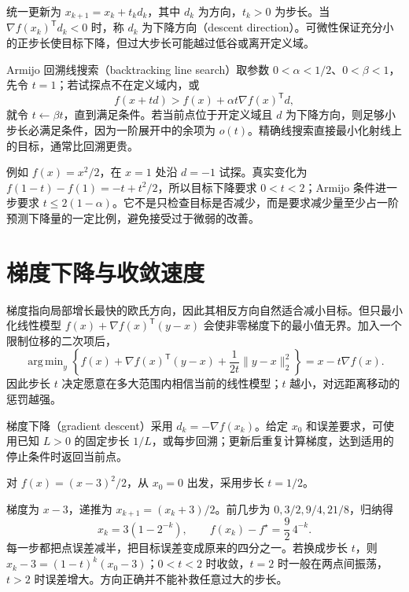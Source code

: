 \documentclass[UTF8,12pt,a4paper,fontset=fandol]{ctexbook}
\begin{document}
统一更新为 $x_{k+1}=x_k+t_kd_k$，其中 $d_k$ 为方向，$t_k>0$ 为步长。当 $\nabla f(x_k)^{\mathsf T}d_k<0$ 时，称 $d_k$ 为下降方向（descent direction）。可微性保证充分小的正步长使目标下降，但过大步长可能越过低谷或离开定义域。

Armijo 回溯线搜索（backtracking line search）取参数 $0<\alpha<1/2$、$0<\beta<1$，先令 $t=1$；若试探点不在定义域内，或
\[
 f(x+td)>f(x)+\alpha t\nabla f(x)^{\mathsf T}d,
\]
就令 $t\leftarrow\beta t$，直到满足条件。若当前点位于开定义域且 $d$ 为下降方向，则足够小步长必满足条件，因为一阶展开中的余项为 $o(t)$。精确线搜索直接最小化射线上的目标，通常比回溯更贵。

例如 $f(x)=x^2/2$，在 $x=1$ 处沿 $d=-1$ 试探。真实变化为 $f(1-t)-f(1)=-t+t^2/2$，所以目标下降要求 $0<t<2$；Armijo 条件进一步要求 $t\leq2(1-\alpha)$。它不是只检查目标是否减少，而是要求减少量至少占一阶预测下降量的一定比例，避免接受过于微弱的改善。

\section{梯度下降与收敛速度}

\label{sec:co-gradient}

梯度指向局部增长最快的欧氏方向，因此其相反方向自然适合减小目标。但只最小化线性模型 $f(x)+\nabla f(x)^{\mathsf T}(y-x)$ 会使非零梯度下的最小值无界。加入一个限制位移的二次项后，
\[
 \mathop{\mathrm{arg\,min}}_y
 \left\{f(x)+\nabla f(x)^{\mathsf T}(y-x)+\frac1{2t}\|y-x\|_2^2\right\}
 =x-t\nabla f(x).
\]
因此步长 $t$ 决定愿意在多大范围内相信当前的线性模型；$t$ 越小，对远距离移动的惩罚越强。

梯度下降（gradient descent）采用 $d_k=-\nabla f(x_k)$。给定 $x_0$ 和误差要求，可使用已知 $L>0$ 的固定步长 $1/L$，或每步回溯；更新后重复计算梯度，达到适用的停止条件时返回当前点。

\begin{example}[手算一次完整的梯度迭代]
对 $f(x)=(x-3)^2/2$，从 $x_0=0$ 出发，采用步长 $t=1/2$。
\end{example}
\begin{solve}
梯度为 $x-3$，递推为 $x_{k+1}=(x_k+3)/2$。前几步为 $0,3/2,9/4,21/8$，归纳得
\[
 x_k=3(1-2^{-k}),\qquad
 f(x_k)-f^\star=\frac92\,4^{-k}.
\]
每一步都把点误差减半，把目标误差变成原来的四分之一。若换成步长 $t$，则 $x_k-3=(1-t)^k(x_0-3)$；$0<t<2$ 时收敛，$t=2$ 时一般在两点间振荡，$t>2$ 时误差增大。方向正确并不能补救任意过大的步长。
\end{solve}
\end{document}

